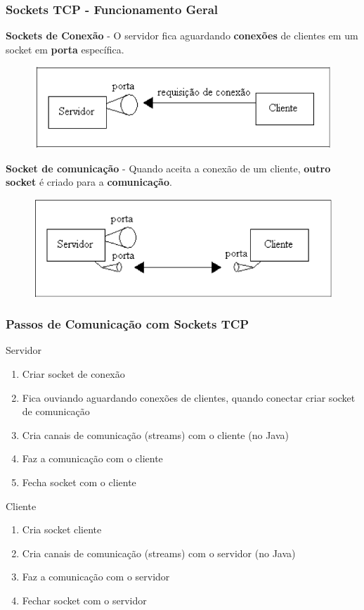 \documentclass[hyperref={pdfpagelabels=false},table]{beamer}
\begin{document}
\begin{frame}[fragile]
	\frametitle{Sockets TCP - Funcionamento Geral}
	\textbf{Sockets de Conexão} - O servidor fica aguardando \textbf{conexões} de clientes em um socket em \textbf{porta} específica.

	\begin{figure}
		\includegraphics[scale=.26]{figs/tcp-conexao}
	\end{figure}

	\textbf{Socket de comunicação} - Quando aceita a conexão de um cliente, \textbf{outro socket} é criado para a \textbf{comunicação}. 
	\begin{figure}
		\includegraphics[scale=.26]{figs/tcp-comunicacao}
	\end{figure}

\end{frame}


\begin{frame}[t]\frametitle{Passos de Comunicação com Sockets TCP }
  \begin{block}{Servidor}
    \begin{enumerate}
      \item Criar socket de conexão 
      \item Fica ouviando aguardando conexões de clientes, quando conectar criar socket de comunicação
      \item Cria canais de comunicação (streams) com o cliente (no Java)
      \item Faz a comunicação com o cliente
      \item Fecha socket com o cliente
    \end{enumerate}
  \end{block}

    \begin{block}{Cliente}
      \begin{enumerate}
	\item Cria socket cliente
	\item Cria canais de comunicação (streams) com o servidor (no Java)
	\item Faz a comunicação com o servidor
	\item Fechar socket com o servidor
    \end{enumerate}
  \end{block}
  
\end{frame}
\end{document}
